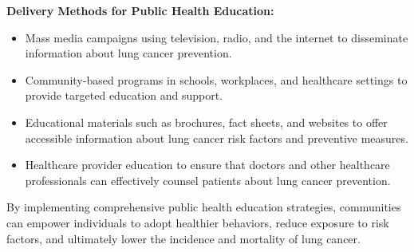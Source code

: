 \vspace{1em}
\textbf{Delivery Methods for Public Health Education:}
\begin{itemize}
    \item Mass media campaigns using television, radio, and the internet to disseminate information 
    about lung cancer prevention.
    \item Community-based programs in schools, workplaces, and healthcare settings to provide 
    targeted education and support.
    \item Educational materials such as brochures, fact sheets, and websites to offer accessible 
    information about lung cancer risk factors and preventive measures.
    \item Healthcare provider education to ensure that doctors and other healthcare professionals 
    can effectively counsel patients about lung cancer prevention.
\end{itemize}

By implementing comprehensive public health education strategies, communities can empower 
individuals to adopt healthier behaviors, reduce exposure to risk factors, and ultimately lower the 
incidence and mortality of lung cancer.
